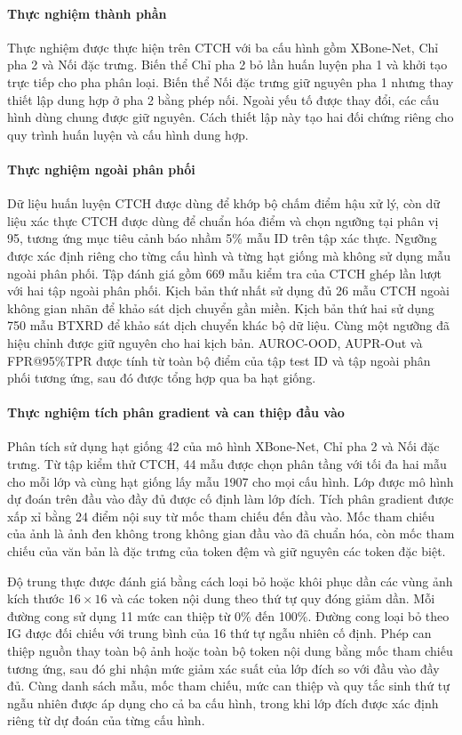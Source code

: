 \paragraph{Thực nghiệm thành phần}
Thực nghiệm được thực hiện trên CTCH với ba cấu hình gồm XBone-Net, Chỉ pha 2 và Nối đặc trưng. Biến thể Chỉ pha 2 bỏ lần huấn luyện pha 1 và khởi tạo trực tiếp cho pha phân loại. Biến thể Nối đặc trưng giữ nguyên pha 1 nhưng thay thiết lập dung hợp ở pha 2 bằng phép nối. Ngoài yếu tố được thay đổi, các cấu hình dùng chung được giữ nguyên. Cách thiết lập này tạo hai đối chứng riêng cho quy trình huấn luyện và cấu hình dung hợp.

\paragraph{Thực nghiệm ngoài phân phối}
Dữ liệu huấn luyện CTCH được dùng để khớp bộ chấm điểm hậu xử lý, còn dữ liệu xác thực CTCH được dùng để chuẩn hóa điểm và chọn ngưỡng tại phân vị 95, tương ứng mục tiêu cảnh báo nhầm 5\% mẫu ID trên tập xác thực. Ngưỡng được xác định riêng cho từng cấu hình và từng hạt giống mà không sử dụng mẫu ngoài phân phối. Tập đánh giá gồm 669 mẫu kiểm tra của CTCH ghép lần lượt với hai tập ngoài phân phối. Kịch bản thứ nhất sử dụng đủ 26 mẫu CTCH ngoài không gian nhãn để khảo sát dịch chuyển gần miền. Kịch bản thứ hai sử dụng 750 mẫu BTXRD để khảo sát dịch chuyển khác bộ dữ liệu. Cùng một ngưỡng đã hiệu chỉnh được giữ nguyên cho hai kịch bản. AUROC-OOD, AUPR-Out và FPR@95\%TPR được tính từ toàn bộ điểm của tập test ID và tập ngoài phân phối tương ứng, sau đó được tổng hợp qua ba hạt giống.

\paragraph{Thực nghiệm tích phân gradient và can thiệp đầu vào}
Phân tích sử dụng hạt giống 42 của mô hình XBone-Net, Chỉ pha 2 và Nối đặc trưng. Từ tập kiểm thử CTCH, 44 mẫu được chọn phân tầng với tối đa hai mẫu cho mỗi lớp và cùng hạt giống lấy mẫu 1907 cho mọi cấu hình. Lớp được mô hình dự đoán trên đầu vào đầy đủ được cố định làm lớp đích. Tích phân gradient được xấp xỉ bằng 24 điểm nội suy từ mốc tham chiếu đến đầu vào. Mốc tham chiếu của ảnh là ảnh đen không trong không gian đầu vào đã chuẩn hóa, còn mốc tham chiếu của văn bản là đặc trưng của token đệm và giữ nguyên các token đặc biệt.

Độ trung thực được đánh giá bằng cách loại bỏ hoặc khôi phục dần các vùng ảnh kích thước $16\times16$ và các token nội dung theo thứ tự quy đóng giảm dần. Mỗi đường cong sử dụng 11 mức can thiệp từ 0\% đến 100\%. Đường cong loại bỏ theo IG được đối chiếu với trung bình của 16 thứ tự ngẫu nhiên cố định. Phép can thiệp nguồn thay toàn bộ ảnh hoặc toàn bộ token nội dung bằng mốc tham chiếu tương ứng, sau đó ghi nhận mức giảm xác suất của lớp đích so với đầu vào đầy đủ. Cùng danh sách mẫu, mốc tham chiếu, mức can thiệp và quy tắc sinh thứ tự ngẫu nhiên được áp dụng cho cả ba cấu hình, trong khi lớp đích được xác định riêng từ dự đoán của từng cấu hình.


